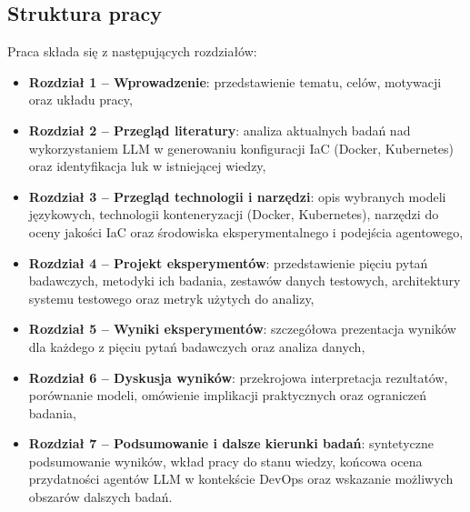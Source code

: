 \subsection{Struktura pracy}

Praca składa się z następujących rozdziałów:
\begin{itemize}
    \item \textbf{Rozdział 1 – Wprowadzenie}: przedstawienie tematu, celów, motywacji oraz układu pracy,
    \item \textbf{Rozdział 2 – Przegląd literatury}: analiza aktualnych badań nad wykorzystaniem LLM w generowaniu konfiguracji IaC (Docker, Kubernetes) oraz identyfikacja luk w istniejącej wiedzy,
    \item \textbf{Rozdział 3 – Przegląd technologii i narzędzi}: opis wybranych modeli językowych, technologii konteneryzacji (Docker, Kubernetes), narzędzi do oceny jakości IaC oraz środowiska eksperymentalnego i podejścia agentowego,
    \item \textbf{Rozdział 4 – Projekt eksperymentów}: przedstawienie pięciu pytań badawczych, metodyki ich badania, zestawów danych testowych, architektury systemu testowego oraz metryk użytych do analizy,
    \item \textbf{Rozdział 5 – Wyniki eksperymentów}: szczegółowa prezentacja wyników dla każdego z pięciu pytań badawczych oraz analiza danych,
    \item \textbf{Rozdział 6 – Dyskusja wyników}: przekrojowa interpretacja rezultatów, porównanie modeli, omówienie implikacji praktycznych oraz ograniczeń badania,
    \item \textbf{Rozdział 7 – Podsumowanie i dalsze kierunki badań}: syntetyczne podsumowanie wyników, wkład pracy do stanu wiedzy, końcowa ocena przydatności agentów LLM w kontekście DevOps oraz wskazanie możliwych obszarów dalszych badań.
\end{itemize}
